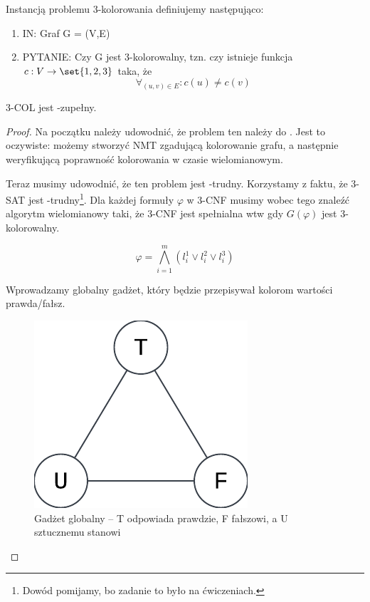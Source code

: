 \begin{definition}
    Instancją problemu 3-kolorowania definiujemy następująco:
    \begin{enumerate}
        \item IN: Graf G = (V,E)
        \item PYTANIE: Czy G jest 3-kolorowalny, tzn. czy istnieje funkcja \(c : V \rightarrow \set{1, 2, 3} \) taka, że \[
            \forall_{(u, v) \in E} : c(u) \neq c(v) 
        \]
    \end{enumerate}
\end{definition}

\begin{theorem}
    3-COL jest \np-zupełny.
\end{theorem}
\begin{proof}
    Na początku należy udowodnić, że problem ten należy do \np. Jest to oczywiste: możemy stworzyć NMT zgadującą kolorowanie grafu, a następnie weryfikującą poprawność kolorowania w czasie wielomianowym.
    
    Teraz musimy udowodnić, że ten problem jest \np-trudny. Korzystamy z faktu, że 3-SAT jest \np-trudny\footnote{Dowód pomijamy, bo zadanie to było na ćwiczeniach.}. Dla każdej formuły $\varphi$ w 3-CNF musimy wobec tego znaleźć algorytm wielomianowy taki, że 3-CNF jest spełnialna wtw gdy $G(\varphi)$ jest 3-kolorowalny. 
    
    \begin{equation*}
        \varphi = \bigwedge_{i=1}^m (l_i^1 \lor l_i^2 \lor l_i^3) 
    \end{equation*}
    
    Wprowadzamy globalny gadżet, który będzie przepisywał kolorom wartości prawda/fałsz.
    
    \begin{figure}[H]
        \centering
        \includegraphics{img/3-coloring-global-gadget.png}
        \caption{Gadżet globalny -- T odpowiada prawdzie, F fałszowi, a U sztucznemu stanowi}
    \end{figure}
    

\end{proof}
